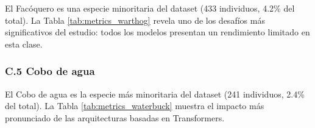 El Facóquero es una especie minoritaria del dataset (433 individuos, 4.2\% del total). La Tabla \ref{tab:metrics_warthog} revela uno de los desafíos más significativos del estudio: todos los modelos presentan un rendimiento limitado en esta clase.

\begin{table}[ht]
\centering
\caption{Métricas de rendimiento para la especie Facóquero (Fase 2).}
\label{tab:metrics_warthog}
\end{table}

\subsubsection*{C.5 Cobo de agua}

El Cobo de agua es la especie más minoritaria del dataset (241 individuos, 2.4\% del total). La Tabla \ref{tab:metrics_waterbuck} muestra el impacto más pronunciado de las arquitecturas basadas en Transformers.

\begin{table}[ht]
\centering
\caption{Métricas de rendimiento para la especie Cobo de agua (Fase 2).}
\label{tab:metrics_waterbuck}
\end{table}

